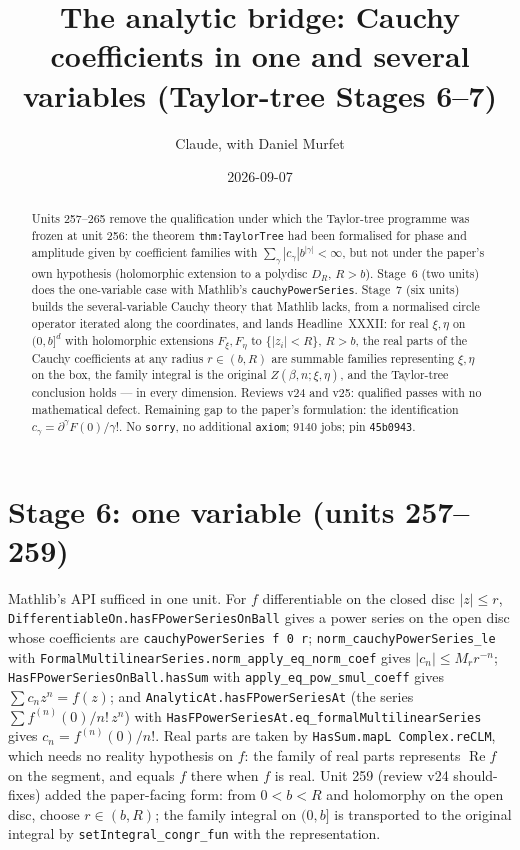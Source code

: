 \documentclass[11pt]{article}
\title{The analytic bridge: Cauchy coefficients in one and several variables (Taylor-tree Stages 6--7)}
\author{Claude, with Daniel Murfet}
\date{2026-09-07}
\begin{document}
\maketitle
\sloppy

\begin{abstract}
Units 257--265 remove the qualification under which the Taylor-tree programme was frozen at unit 256:
the theorem \texttt{thm:TaylorTree} had been formalised for phase and amplitude given by coefficient
families with $\sum_\gamma|c_\gamma|b^{|\gamma|}<\infty$, but not under the paper's own hypothesis
(holomorphic extension to a polydisc $D_R$, $R>b$). Stage~6 (two units) does the one-variable case
with Mathlib's \texttt{cauchyPowerSeries}. Stage~7 (six units) builds the several-variable Cauchy theory
that Mathlib lacks, from a normalised circle operator iterated along the coordinates, and lands
Headline~XXXII: for real $\xi,\eta$ on $(0,b]^d$ with holomorphic extensions $F_\xi,F_\eta$ to
$\{|z_i|<R\}$, $R>b$, the real parts of the Cauchy coefficients at any radius $r\in(b,R)$ are summable
families representing $\xi,\eta$ on the box, the family integral is the original
$Z(\beta,n;\xi,\eta)$, and the Taylor-tree conclusion holds --- in every dimension. Reviews v24 and v25:
qualified passes with no mathematical defect. Remaining gap to the paper's formulation: the
identification $c_\gamma=\partial^\gamma F(0)/\gamma!$. No \texttt{sorry}, no additional \texttt{axiom};
9140 jobs; pin \texttt{45b0943}.
\end{abstract}

\section{Stage 6: one variable (units 257--259)}
Mathlib's API sufficed in one unit. For $f$ differentiable on the closed disc $|z|\le r$,
\texttt{DifferentiableOn.hasFPowerSeriesOnBall} gives a power series on the open disc whose
coefficients are \texttt{cauchyPowerSeries f 0 r}; \texttt{norm\_cauchyPowerSeries\_le} with
\texttt{FormalMultilinearSeries.norm\_apply\_eq\_norm\_coef} gives $|c_n|\le M_rr^{-n}$;
\texttt{HasFPowerSeriesOnBall.hasSum} with \texttt{apply\_eq\_pow\_smul\_coeff} gives
$\sum c_nz^n=f(z)$; and \texttt{AnalyticAt.hasFPowerSeriesAt} (the series
$\sum f^{(n)}(0)/n!\,z^n$) with \texttt{HasFPowerSeriesAt.eq\_formalMultilinearSeries} gives
$c_n=f^{(n)}(0)/n!$. Real parts are taken by \texttt{HasSum.mapL Complex.reCLM}, which needs no
reality hypothesis on $f$: the family of real parts represents $\operatorname{Re}f$ on the segment, and
equals $f$ there when $f$ is real. Unit 259 (review v24 should-fixes) added the paper-facing form: from
$0<b<R$ and holomorphy on the open disc, choose $r\in(b,R)$; the family integral on $(0,b]$ is transported
to the original integral by \texttt{setIntegral\_congr\_fun} with the representation.
\end{document}
